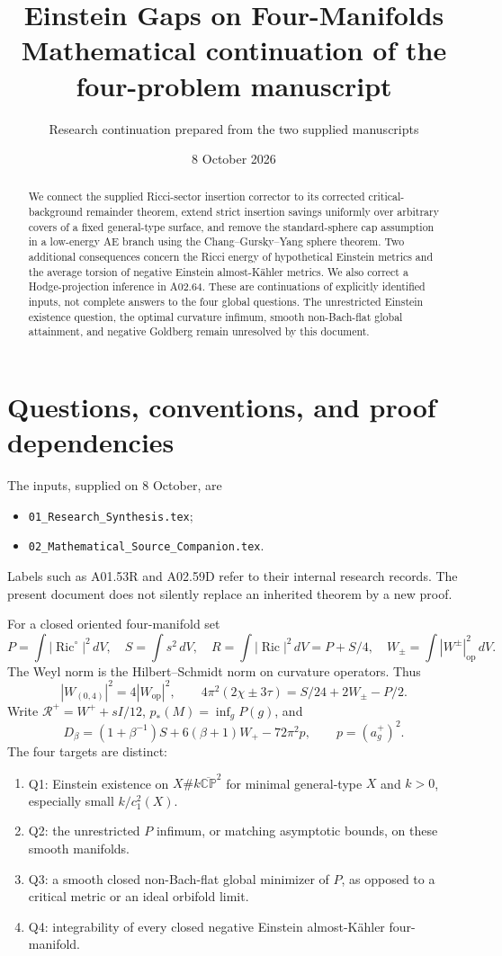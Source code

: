 \documentclass[11pt,a4paper]{article}
\title{Einstein Gaps on Four-Manifolds\\\large Mathematical continuation of the four-problem manuscript}
\author{Research continuation prepared from the two supplied manuscripts}
\date{8 October 2026}
\theoremstyle{remark}\newtheorem{remark}[theorem]{Remark}
\newcommand{\Ric}{\operatorname{Ric}}
\newcommand{\CP}{\mathbb{CP}}
\newcommand{\cR}{\mathcal R}
\newcommand{\dd}{\,dV}
\begin{document}
\maketitle
\begin{abstract}
We connect the supplied Ricci-sector insertion corrector to its corrected critical-background remainder theorem, extend strict insertion savings uniformly over arbitrary covers of a fixed general-type surface, and remove the standard-sphere cap assumption in a low-energy AE branch using the Chang--Gursky--Yang sphere theorem. Two additional consequences concern the Ricci energy of hypothetical Einstein metrics and the average torsion of negative Einstein almost-K\"ahler metrics. We also correct a Hodge-projection inference in A02.64. These are continuations of explicitly identified inputs, not complete answers to the four global questions. The unrestricted Einstein existence question, the optimal curvature infimum, smooth non-Bach-flat global attainment, and negative Goldberg remain unresolved by this document.
\end{abstract}
\tableofcontents

\section{Questions, conventions, and proof dependencies}
The inputs, supplied on 8 October, are
\begin{itemize}
\item \texttt{01\_Research\_Synthesis.tex};
\item \texttt{02\_Mathematical\_Source\_Companion.tex}.
\end{itemize}
Labels such as A01.53R and A02.59D refer to their internal research records.
The present document does not silently replace an inherited theorem by a new proof.

For a closed oriented four-manifold set
\[
 P=\int|\Ric^\circ|^2\dd,\quad S=\int s^2\dd,\quad
 R=\int|\Ric|^2\dd=P+S/4,\quad
 W_\pm=\int|W^\pm|_{\mathrm{op}}^2\dd.
\]
The Weyl norm is the Hilbert--Schmidt norm on curvature operators. Thus
\[
 |W_{(0,4)}|^2=4|W_{\mathrm{op}}|^2,\qquad
 4\pi^2(2\chi\pm3\tau)=S/24+2W_\pm-P/2.
\]
Write $\cR^+=W^++sI/12$, $p_*(M)=\inf_gP(g)$, and
\[
 D_\beta=(1+\beta^{-1})S+6(\beta+1)W_+-72\pi^2p,
 \qquad p=(a_g^+)^2.
\]
The four targets are distinct:
\begin{enumerate}
\item Q1: Einstein existence on $X\#k\overline{\CP}^2$ for minimal general-type $X$ and $k>0$, especially small $k/c_1^2(X)$.
\item Q2: the unrestricted $P$ infimum, or matching asymptotic bounds, on these smooth manifolds.
\item Q3: a smooth closed non-Bach-flat global minimizer of $P$, as opposed to a critical metric or an ideal orbifold limit.
\item Q4: integrability of every closed negative Einstein almost-K\"ahler four-manifold.
\end{enumerate}
\end{document}
